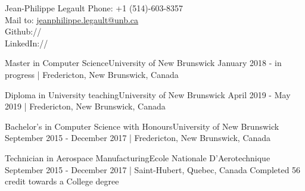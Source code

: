 \documentclass[english,letterpaper,12pt]{deedy-resume-openfont}
\begin{document}
\justify
\singlespacing

\namesection
{Jean-Philippe}
{Legault}
{%
    Phone: +1 (514)-603-8357\\
    Mail to: \href{mailto:jeanphilippe.legault@unb.ca}{jeanphilippe.legault@unb.ca}\\
    Github://\href{https://github.com/jeanlego}{}\\
    LinkedIn://\href{https://www.linkedin.com/in/jean-philippe-legault-1489ab173}{}\\
}


    \employement%
        {Master in Computer Science}{University of New Brunswick}
        {January 2018 - in progress | Fredericton, New Brunswick, Canada}{%
        }

    \employement%
        {Diploma in University teaching}{University of New Brunswick}
        {April 2019 - May 2019 | Fredericton, New Brunswick, Canada}{%
        }

    \employement%
        {Bachelor's in Computer Science with Honours}{University of New Brunswick}
        {September 2015 - December 2017 | Fredericton, New Brunswick, Canada}{%
        }

    \employement%
        {Technician in Aerospace Manufacturing}{Ecole Nationale D'Aerotechnique}
        {September 2015 - December 2017 | Saint-Hubert, Quebec, Canada}{%
        Completed 56 credit towards a College degree
        }





\end{document}
